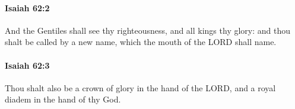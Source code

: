 		\paragraph{Isaiah 62:2} %
			\label{ISAIAH-62-2}

			And the Gentiles shall see thy righteousness, and all kings thy glory: and thou shalt be called by a new name, which the mouth of the LORD shall name.


		\paragraph{Isaiah 62:3} %
			\label{ISAIAH-62-3}

			Thou shalt also be a crown of glory in the hand of the LORD, and a royal diadem in the hand of thy God.


